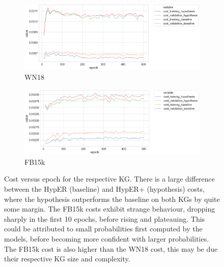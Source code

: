 \begin{figure}[H]
	\begin{subfigure}[b]{.5\linewidth}
   		\centering
    		\includegraphics[width=1.0\linewidth, height=0.6\linewidth]{WN18_Cost_Results}
		\captionsetup{justification=centering}
		\caption{WN18}
	\end{subfigure}
	\begin{subfigure}[b]{.5\linewidth}
   		\centering
		\includegraphics[width=1.0\linewidth, height=0.6\linewidth]{FB15k_Cost_Results}
		\captionsetup{justification=centering}
		\caption{FB15k}
	\end{subfigure}
	\captionsetup{justification=centering}
	\caption{Cost versus epoch for the respective KG. There is a large difference between the HypER (baseline) and HypER+ (hypothesis) costs, where the hypothesis outperforms the baseline on both KGs by quite some margin. The FB15k costs exhibit strange behaviour, dropping sharply in the first 10 epochs, before rising and plateauing. This could be attributed to small probabilities first computed by the models, before becoming more confident with larger probabilities. The FB15k cost is also higher than the WN18 cost, this may be due their respective KG size and complexity.}
\end{figure}

